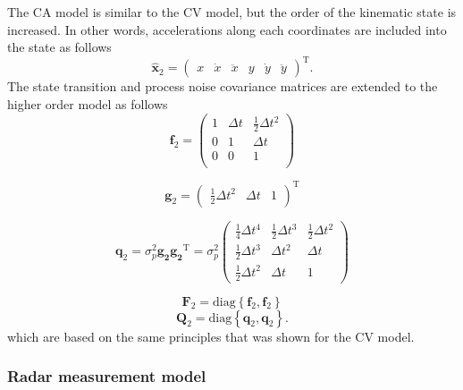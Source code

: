 \documentclass[english, 12pt, a4paper, elec, utf8, a-1b, online]{aaltothesis}
\renewcommand{\vec}[1]{\mathbf{#1}}
\newcommand{\transpose}[1]{#1^\text{T}}
\newcommand{\dt}{\Delta t}
\newcommand{\diag}[1]{\text{diag}\left\{ #1 \right\}}
\begin{document}
The CA model is similar to the CV model, but the order of the kinematic state is increased.
In other words, accelerations along each coordinates are included into the state as follows  
\begin{equation}\label{eq:x_mode2}
    \hat{\mathbf{x}}_2 =
        \transpose{
        \begin{pmatrix}
            x & \dot{x} & \ddot{x} & y & \dot{y} & \ddot{y}
        \end{pmatrix}}.
\end{equation}
The state transition and process noise covariance matrices are extended to the higher order model as follows    
\begin{equation}\label{eq:f_mode2}
    \vec{f}_2 = 
    \begin{pmatrix}
        1 & \dt & \frac{1}{2}\dt^2  \\ 
        0 & 1 & \dt \\
        0 & 0 & 1  \\
    \end{pmatrix}
\end{equation}

\begin{equation}
    \vec{g}_2 = \transpose{
        \begin{pmatrix}
            \frac{1}{2} \dt^2 & \dt & 1
        \end{pmatrix}
    }
\end{equation}

\begin{equation}
    \vec{q}_2 = \sigma_p^2 \vec{g_2} \transpose{\vec{g_2}}  =  \sigma_p^2
        \begin{pmatrix}
            \frac{1}{4} \dt^4 & \frac{1}{2} \dt^3 & \frac{1}{2} \dt^2 \\ 
            \frac{1}{2} \dt^3 & \dt^2 &  \dt \\
            \frac{1}{2} \dt^2 & \dt & 1
        \end{pmatrix}
\end{equation}

\begin{equation}\label{eq:F_mode2}
\vec{F}_2 = \diag{\vec{f}_2, \vec{f}_2}
\end{equation}
\begin{equation}
    \vec{Q}_2 = \diag{\vec{q}_2, \vec{q}_2}.
\end{equation}
which are based on the same principles that was shown for the CV model.

\subsubsection{Radar measurement model}
\end{document}
